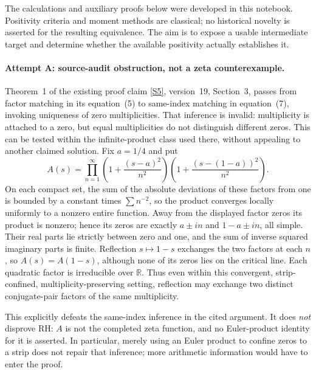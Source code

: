 \documentclass[11pt]{article}
\newcommand{\R}{\mathbb{R}}
\newcommand{\sref}[2]{\hyperlink{source:#1:#2}{[S#2]}}
\begin{document}
The calculations and auxiliary proofs below were developed in this notebook.
Positivity criteria and moment methods are classical; no historical novelty
is asserted for the resulting equivalence. The aim is to expose a usable
intermediate target and determine whether the available positivity actually
establishes it.

\paragraph{Attempt A: source-audit obstruction, not a zeta counterexample.}
Theorem~1 of the existing proof claim \sref{statement}{5}, version~19,
Section~3, passes from factor matching in its equation~(5) to same-index
matching in equation~(7), invoking uniqueness of zero multiplicities. That
inference is invalid: multiplicity is attached to a zero, but equal
multiplicities do not distinguish different zeros. This can be tested within
the infinite-product class used there, without appealing to another claimed
solution. Fix $a=1/4$ and put
\begin{equation}\label{ra:statement:symmetry-test}
 A(s)=\prod_{n=1}^{\infty}
 \left(1+\frac{(s-a)^2}{n^2}\right)
 \left(1+\frac{(s-(1-a))^2}{n^2}\right).
\end{equation}
On each compact set, the sum of the absolute deviations of these factors from
one is bounded by a constant times $\sum n^{-2}$, so the product converges
locally uniformly to a nonzero entire function. Away from the displayed
factor zeros its product is nonzero; hence its zeros are exactly
$a\pm in$ and $1-a\pm in$, all simple. Their real parts lie strictly between
zero and one, and the sum of inverse squared imaginary parts is finite.
Reflection $s\mapsto1-s$ exchanges the two factors at each $n$, so
$A(s)=A(1-s)$, although none of its zeros lies on the critical line.
Each quadratic factor is irreducible over $\R$. Thus even within this
convergent, strip-confined, multiplicity-preserving setting, reflection may
exchange two distinct conjugate-pair factors of the same multiplicity.

This explicitly defeats the same-index inference in the cited argument.
It does \emph{not} disprove RH: $A$ is not the completed zeta function, and no
Euler-product identity for it is asserted. In particular, merely using an
Euler product to confine zeros to a strip does not repair that inference;
more arithmetic information would have to enter the proof.
\end{document}
